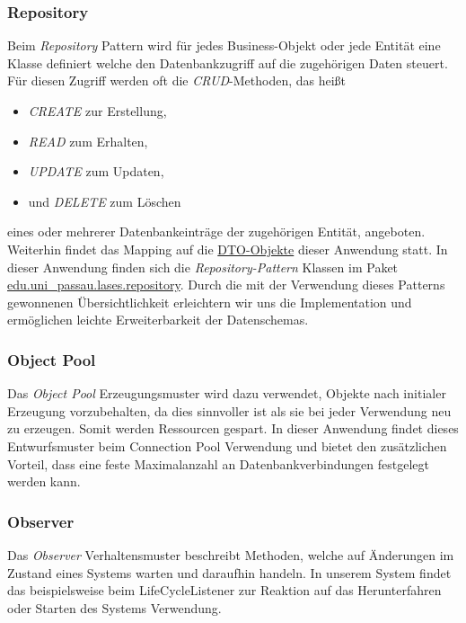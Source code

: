 \subsubsection{Repository}
Beim \emph{Repository} Pattern wird für jedes Business-Objekt oder jede Entität
eine Klasse definiert welche den Datenbankzugriff auf die zugehörigen Daten steuert.
Für diesen Zugriff werden oft die \textit{CRUD}-Methoden, das heißt
\begin{itemize}
    \item \textit{CREATE} zur Erstellung,
    \item \textit{READ} zum Erhalten,
    \item \textit{UPDATE} zum Updaten,
    \item und \textit{DELETE} zum Löschen
\end{itemize}
eines oder mehrerer Datenbankeinträge der zugehörigen Entität, angeboten.
Weiterhin findet das Mapping auf die \hyperref[arch:transport]{DTO-Objekte} dieser Anwendung statt.
In dieser Anwendung finden sich die \emph{Repository-Pattern} Klassen im Paket
\hyperref[arch:repository]{edu.uni\_passau.lases.repository}. Durch die mit
der Verwendung dieses Patterns gewonnenen Übersichtlichkeit erleichtern wir uns die
Implementation und ermöglichen leichte Erweiterbarkeit der Datenschemas.

\subsubsection{Object Pool}
Das \emph{Object Pool} Erzeugungsmuster wird dazu verwendet, Objekte nach initialer Erzeugung
vorzubehalten, da dies sinnvoller ist als sie bei jeder Verwendung neu zu erzeugen.
Somit werden Ressourcen gespart. In dieser Anwendung findet dieses Entwurfsmuster
beim Connection Pool %
Verwendung und bietet den zusätzlichen Vorteil, dass eine feste Maximalanzahl an
Datenbankverbindungen festgelegt werden kann.

\subsubsection{Observer}
Das \emph{Observer} Verhaltensmuster beschreibt Methoden, welche auf
Änderungen im Zustand eines Systems warten und daraufhin handeln.
In unserem System findet das beispielsweise beim LifeCycleListener %
zur Reaktion auf das Herunterfahren oder Starten des Systems Verwendung.

